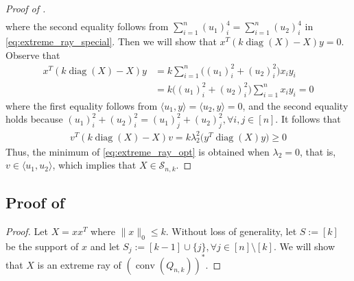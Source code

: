 \documentclass[11pt]{amsart}
\newcommand{\Szero}[2]{\ensuremath{\mathcal{S}_{#1,#2}}}
\theoremstyle{plain}
\theoremstyle{definition}
\theoremstyle{remark}
\DeclareMathOperator{\conv}{conv}
\DeclareMathOperator{\diag}{diag}
\begin{document}
\begin{appendices}
\begin{proof}[Proof of ]
\begin{equation}
\begin{split}
            \end{split}
        \end{equation}
        where the second equality follows from \(\sum_{i=1}^n(u_1)_i^4 = \sum_{i=1}^n(u_2)_i^4\) in \eqref{eq:extreme_ray_special}. Then we will show that \(x^T(k\diag(X)-X)y=0\). Observe that
        \begin{equation}
            \begin{split}
                 x^T(k\diag(X)-X)y 
                &= k\sum_{i=1}^n \big((u_1)_i^2 + (u_2)_i^2\big) x_iy_i \\
                &= k \big((u_1)_i^2 + (u_2)_i^2\big) \sum_{i=1}^n x_iy_i = 0
            \end{split}
        \end{equation}
        where the first equality follows from \(\langle u_1,y\rangle=\langle u_2,y\rangle=0\), and the second equality holds because \((u_1)_i^2 + (u_2)_i^2 = (u_1)_j^2 + (u_2)_j^2, \forall i,j\in [n]\).
        It follows that
        \begin{equation}
            \begin{split}
                 v^T (k\diag(X)-X)v =  k \lambda_2^2 \big(y^T\diag(X)y\big)\geq0 
            \end{split}
        \end{equation}
        Thus, the minimum of \eqref{eq:extreme_ray_opt} is obtained when \(\lambda_2=0\), that is, \(v\in \langle u_1,u_2\rangle\), which implies that \(X \in \Szero{n}{k}\).
	\end{proof}
	
		\subsection{Proof of }\label{append:thm_extreme_ray_dual}
		\begin{proof}
			Let \(X = xx^T\) where \(\|x\|_0\leq k\). Without loss of generality, let \(S := [k]\) be the support of \(x\) and let \(S_j := [k-1] \cup \{j\}, \forall j \in [n] \setminus [k]\). We will show that \(X\) is an extreme ray of \((\conv(Q_{n,k}))^*\).
			

\end{proof}
\end{appendices}
\end{document}
